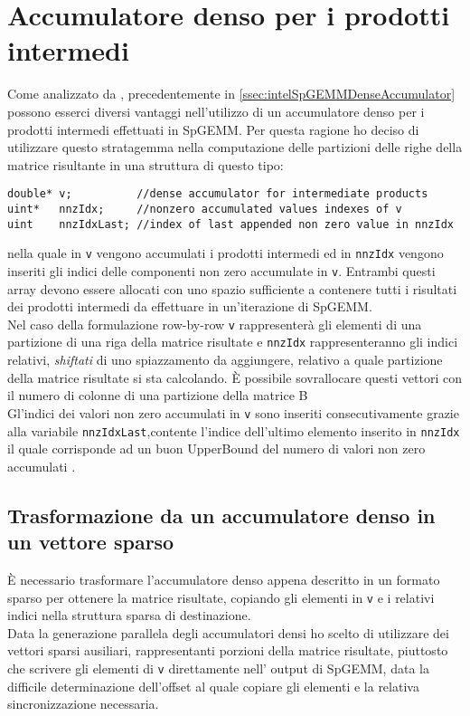 \section{Accumulatore denso per i prodotti intermedi} %
Come analizzato da \parencite{intelSpGEMMDenseAccumulator}, precedentemente in 
\ref{ssec:intelSpGEMMDenseAccumulator} possono esserci diversi vantaggi 
nell'utilizzo di un accumulatore denso per i prodotti intermedi effettuati in SpGEMM.
Per questa ragione ho deciso di utilizzare questo stratagemma nella
computazione delle partizioni delle righe della matrice risultante in una
struttura di questo tipo:
\begin{lstlisting}
double* v;          //dense accumulator for intermediate products
uint*   nnzIdx;     //nonzero accumulated values indexes of v
uint    nnzIdxLast; //index of last appended non zero value in nnzIdx
\end{lstlisting}    %
nella quale in \verb|v| vengono accumulati i prodotti intermedi 
ed in \verb|nnzIdx| vengono inseriti gli indici delle componenti non zero accumulate in \verb|v|.
Entrambi questi array devono essere allocati con uno spazio sufficiente a contenere
tutti i risultati dei prodotti intermedi da effettuare in un'iterazione di SpGEMM. \\
Nel caso della formulazione row-by-row 
\verb|v| rappresenterà gli elementi \nnz di una partizione di una riga della matrice risultate e
\verb|nnzIdx| rappresenteranno gli indici relativi, \emph{shiftati} di uno %
spiazzamento da aggiungere, relativo a quale partizione della matrice risultate si sta calcolando.
È possibile sovrallocare questi vettori con il numero di colonne di una partizione della matrice B\\
Gl'indici dei valori non zero accumulati in \verb|v| sono inseriti consecutivamente grazie   
alla variabile \verb|nnzIdxLast|,contente l'indice dell'ultimo elemento inserito in \verb|nnzIdx|
il quale corrisponde ad un buon UpperBound del numero di valori non zero accumulati .\\

\subsection{Trasformazione da un accumulatore denso in un vettore sparso}  %
\label{ch2:sparsifyDenseVect}
È necessario trasformare l'accumulatore denso appena descritto in un 
formato sparso per ottenere la matrice risultate, copiando gli elementi \nnz 
in \verb|v| e i relativi indici nella struttura sparsa di destinazione.\\
Data la generazione parallela degli accumulatori densi
ho scelto di utilizzare dei vettori sparsi ausiliari, rappresentanti porzioni della matrice risultate, 
piuttosto che scrivere gli elementi \nnz di \verb|v| direttamente nell' output di SpGEMM,
data la difficile determinazione dell'offset al quale copiare gli elementi \nnz e la relativa sincronizzazione necessaria.


